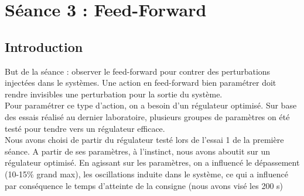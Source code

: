 \section{Séance 3 : Feed-Forward}
\subsection{Introduction}
But de la séance : observer le feed-forward pour contrer des perturbations injectées dans le systèmes. Une action en feed-forward bien paramétrer doit rendre invisibles une perturbation pour la sortie du système.\\

Pour paramétrer ce type d'action, on a besoin d'un régulateur optimisé. Sur base des essais réalisé au dernier laboratoire, plusieurs groupes de paramètres on été testé pour tendre vers un régulateur efficace. \\

Nous avons choisi de partir du régulateur testé lors de l'essai 1 de la première séance. A partir de ses paramètres, à l'instinct, nous avons aboutit sur un régulateur optimisé. En agissant sur les paramètres, on a influencé le dépassement (10-15\% grand max), les oscillations induite dans le système, ce qui a influencé par conséquence le temps d'atteinte de la consigne (nous avons visé les 200 s)

